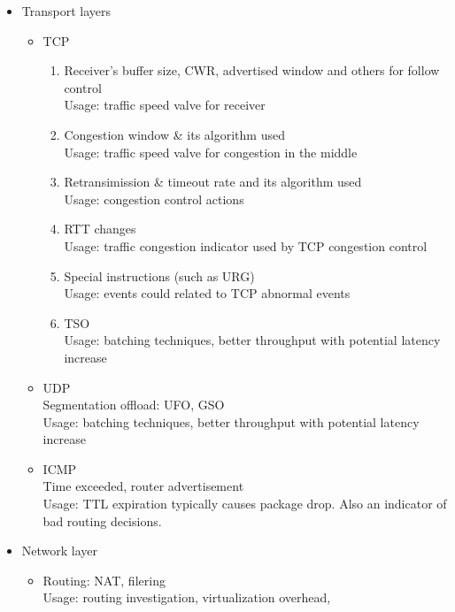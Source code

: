 \begin{itemize}
\begin{itemize}
\begin{itemize}
      \item Transport layers
        \begin{itemize}
          \item TCP
            \begin{enumerate}
              \item Receiver's buffer size, CWR, advertised window and others for follow control \autocite{DBLP:books/MKP/Larry2011} \\
                Usage: traffic speed valve for receiver
              \item Congestion window & its algorithm used  \autocite{DBLP:books/MKP/Larry2011,DBLP:conf/sigcomm/AlizadehGMPPPSS10}\\
                Usage: traffic speed valve for congestion in the middle
              \item Retransimission & timeout rate and its algorithm used \\
                Usage: congestion control actions
              \item RTT changes \\
                Usage: traffic congestion indicator used by TCP congestion control
              \item Special instructions (such as URG) \\
                Usage: events could related to TCP abnormal events
              \item TSO \\
                Usage: batching techniques, better throughput with potential latency increase
            \end{enumerate}
      \item UDP \\
        Segmentation offload: UFO, GSO \\
        Usage: batching techniques, better throughput with potential latency increase
      \item ICMP \\
        Time exceeded, router advertisement \\
        Usage: TTL expiration typically causes package drop. Also an indicator of bad routing decisions.
    \end{itemize}
   \item Network layer
        \begin{itemize}
        \item {Routing: NAT, filering} \\
            Usage: routing investigation, virtualization overhead,

\end{itemize}
\end{itemize}
\end{itemize}
\end{itemize}
